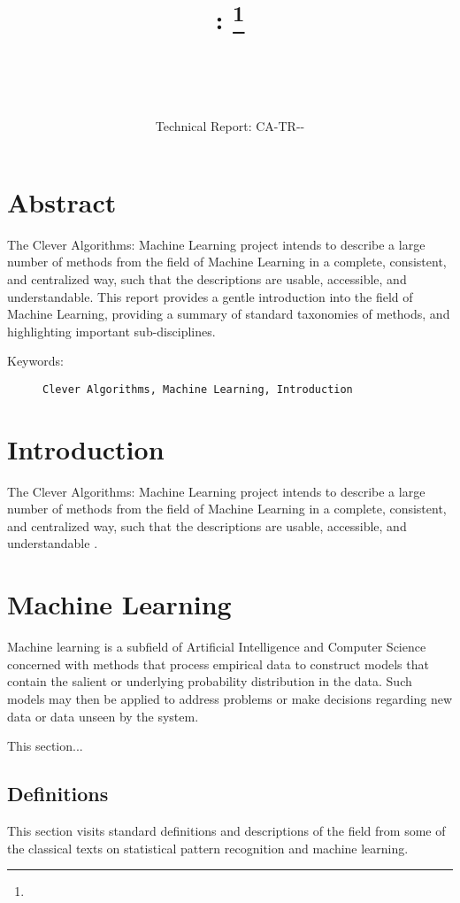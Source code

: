 \documentclass[a4paper, 11pt]{article}
\title{{\myreporttitle}: {\myreportsubtitle}\footnote{\myreportlicense}}
\author{\myreportauthor\\{\myreportemail}\\\small\myreportproject}
\date{\myreportfulldate\\{\small{Technical Report: CA-TR-{\myreportdate}-\myreportversion}}}
\begin{document}
\maketitle

\section*{Abstract} 
The Clever Algorithms: Machine Learning project intends to describe a large number of methods from the field of Machine Learning in a complete, consistent, and centralized way, such that the descriptions are usable, accessible, and understandable.
This report provides a gentle introduction into the field of Machine Learning, providing a summary of standard taxonomies of methods, and highlighting important sub-disciplines. 

\begin{description}
	\item[Keywords:] {\small\texttt{Clever Algorithms, Machine Learning, Introduction}}
\end{description} 

\section{Introduction}
\label{sec:introduction}
The Clever Algorithms: Machine Learning project intends to describe a large number of methods from the field of Machine Learning in a complete, consistent, and centralized way, such that the descriptions are usable, accessible, and understandable \cite{Brownlee2011a}.


\section{Machine Learning}
\label{sec:machine_learning}
Machine learning is a subfield of Artificial Intelligence and Computer Science concerned with methods that process empirical data to construct models that contain the salient or underlying probability distribution in the data. Such models may then be applied to address problems or make decisions regarding new data or data unseen by the system.

This section... 

\subsection{Definitions}
This section visits standard definitions and descriptions of the field from some of the classical texts on statistical pattern recognition and machine learning. 
\end{document}
